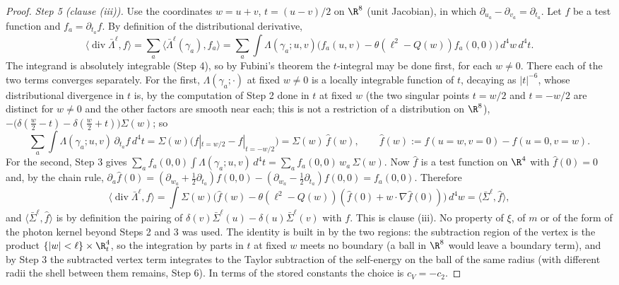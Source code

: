 \begin{proof}
\emph{Step 5 (clause (iii)).} Use the coordinates $w = u + v$, $t = (u - v)/2$ on $\R^{8}$ (unit Jacobian), in which $\partial_{u_{a}} - \partial_{v_{a}} = \partial_{t_{a}}$. Let $f$ be a test function and $f_{a} = \partial_{t_{a}}f$. By definition of the distributional derivative,
\[
\langle\operatorname{div}\bar\Lambda^{\ell},f\rangle = \sum_{a}\langle\bar\Lambda^{\ell}(\gamma_{a}),f_{a}\rangle = \sum_{a}\int\Lambda(\gamma_{a};u,v)\big(f_{a}(u,v) - \theta(\ell^{2} - Q(w))f_{a}(0,0)\big)\,d^{4}w\,d^{4}t .
\]
The integrand is absolutely integrable (Step 4), so by Fubini's theorem the $t$-integral may be done first, for each $w \neq 0$. There each of the two terms converges separately. For the first, $\Lambda(\gamma_{a};\cdot)$ at fixed $w \neq 0$ is a locally integrable function of $t$, decaying as $|t|^{-6}$, whose distributional divergence in $t$ is, by the computation of Step 2 done in $t$ at fixed $w$ (the two singular points $t = w/2$ and $t = -w/2$ are distinct for $w \neq 0$ and the other factors are smooth near each; this is not a restriction of a distribution on $\R^{8}$), $-\big(\delta(\tfrac{w}{2}-t) - \delta(\tfrac{w}{2}+t)\big)\Sigma(w)$; so
\[
\sum_{a}\int\Lambda(\gamma_{a};u,v)\,\partial_{t_{a}}f\,d^{4}t = \Sigma(w)\big(f|_{t = w/2} - f|_{t = -w/2}\big) = \Sigma(w)\,\hat f(w), \qquad \hat f(w) := f(u{=}w,v{=}0) - f(u{=}0,v{=}w).
\]
For the second, Step 3 gives $\sum_{a}f_{a}(0,0)\int\Lambda(\gamma_{a};u,v)\,d^{4}t = \sum_{a}f_{a}(0,0)\,w_{a}\,\Sigma(w)$. Now $\hat f$ is a test function on $\R^{4}$ with $\hat f(0) = 0$ and, by the chain rule, $\partial_{a}\hat f(0) = (\partial_{w_{a}} + \tfrac12\partial_{t_{a}})f(0,0) - (\partial_{w_{a}} - \tfrac12\partial_{t_{a}})f(0,0) = f_{a}(0,0)$. Therefore
\[
\langle\operatorname{div}\bar\Lambda^{\ell},f\rangle = \int\Sigma(w)\big(\hat f(w) - \theta(\ell^{2} - Q(w))(\hat f(0) + w\cdot\nabla\hat f(0))\big)\,d^{4}w = \langle\bar\Sigma^{\ell},\hat f\rangle ,
\]
and $\langle\bar\Sigma^{\ell},\hat f\rangle$ is by definition the pairing of $\delta(v)\bar\Sigma^{\ell}(u) - \delta(u)\bar\Sigma^{\ell}(v)$ with $f$. This is clause (iii). No property of $\xi$, of $m$ or of the form of the photon kernel beyond Steps 2 and 3 was used. The identity is built in by the two regions: the subtraction region of the vertex is the product $\{|w| < \ell\}\times\R^{4}_{t}$, so the integration by parts in $t$ at fixed $w$ meets no boundary (a ball in $\R^{8}$ would leave a boundary term), and by Step 3 the subtracted vertex term integrates to the Taylor subtraction of the self-energy on the ball of the same radius (with different radii the shell between them remains, Step 6). In terms of the stored constants the choice is $c_{V} = -c_{2}$.


\end{proof}
